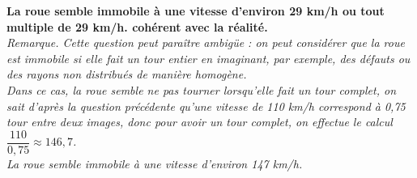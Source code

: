 \begin{enumerate}
   {\bf La roue semble immobile à une vitesse d'environ 29 km/h ou tout multiple de 29 km/h. cohérent avec la réalité.} \\ [5mm]
   {\it Remarque. Cette question peut paraître ambigüe : on peut considérer que la roue est immobile si elle fait un tour entier en imaginant, par exemple, des défauts ou des rayons non distribués de manière homogène. \\
      Dans ce cas, la roue semble ne pas tourner lorsqu'elle fait un tour complet, on sait d'après la question précédente qu'une vitesse de 110 km/h correspond à 0,75 tour entre deux images, donc pour avoir un tour complet, on effectue le calcul $\dfrac{110}{0,75} \approx146,7$. \\ [1mm]
      La roue semble immobile à une vitesse d'environ 147 km/h.}
\end{enumerate}
